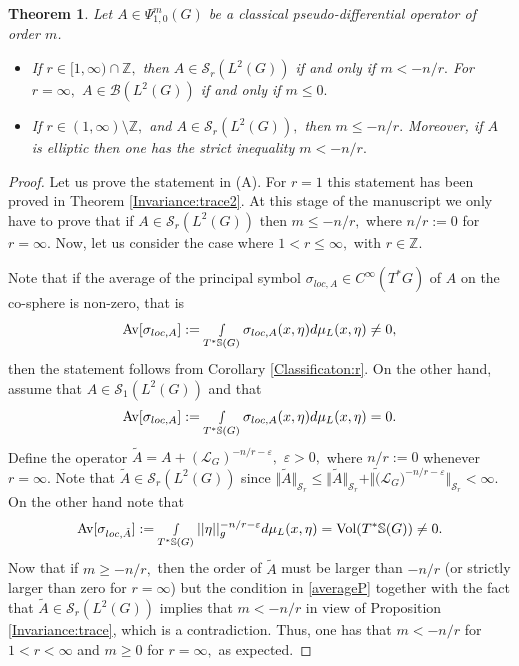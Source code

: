 \documentclass[12pt, reqno]{amsart}
\newtheorem{theorem}{Theorem}[section]
\theoremstyle{definition}
\theoremstyle{remark}
\numberwithin{equation}{section}
\begin{document}
\begin{theorem}\label{Invariance:trace2r} Let $A\in \Psi^{m}_{1,0}(G)$ be a classical  pseudo-differential operator of order $m$.
\begin{itemize}
    \item[(A)] If $r\in [1,\infty)\cap \mathbb{Z},$ then
$A\in \mathscr{S}_r(L^2(G))$ if and only if $m<-n/r.$ For $r=\infty,$     $A\in \mathscr{B}(L^2(G))$ if and only if $m\leq 0.$ 
\item[(B)] If $r\in (1,\infty)\setminus \mathbb{Z},$ and   $A\in \mathscr{S}_{r}(L^2(G)),$ then $m\leq -n/r.$ Moreover, if $A$ is elliptic then one has the strict inequality $m<-n/r.$
\end{itemize}
\end{theorem}
\begin{proof}
Let us prove the statement in (A).
For $r=1$ this statement  has been proved in Theorem \ref{Invariance:trace2}. At this stage of the manuscript we only have to prove that if  $A\in  \mathscr{S}_r(L^2(G)) $ then $m\leq -n/r,$ where $n/r:=0$ for $r=\infty.$  Now, let us consider the case where $1<r\leq \infty,$ with $r\in \mathbb{Z}.$ 

Note that if the average of the principal symbol $\sigma_{loc,A}\in C^\infty(T^*G)$ of $A$ on the co-sphere is non-zero, that is
\begin{equation}
    \textnormal{Av}[\sigma_{loc,A}]:=\smallint\limits_{ T^{*}\mathbb{S}(G)}\sigma_{loc,A}(x,\eta)d\mu_{L}(x,\eta)\neq 0,
\end{equation}then the statement follows from Corollary \ref{Classificaton:r}. On the other hand, assume that $A\in \mathscr{S}_1(L^2(G))$ and that 
\begin{equation}
    \textnormal{Av}[\sigma_{loc,A}]:=\smallint\limits_{ T^{*}\mathbb{S}(G)}\sigma_{loc,A}(x,\eta)d\mu_{L}(x,\eta)= 0.
\end{equation}Define the operator $\tilde{A}=A+(\mathcal{L}_G)^{-n/r-\varepsilon},$ $\varepsilon>0,$ where $n/r:=0$ whenever $r=\infty.$ Note that $\tilde A\in  \mathscr{S}_r(L^2(G)) $ since $\Vert \tilde A\Vert_{\mathscr{S}_r}\leq \Vert \tilde A\Vert_{\mathscr{S}_r}+\Vert \tilde (\mathcal{L}_G)^{-n/r-\varepsilon}\Vert_{\mathscr{S}_r}<\infty. $ On the other hand note that 
\begin{equation}\label{averageP}
    \textnormal{Av}[\sigma_{loc,\tilde A}]:=\smallint\limits_{ T^{*}\mathbb{S}(G)}||\eta||^{-n/r-\varepsilon}_gd\mu_{L}(x,\eta)=\textnormal{Vol}(T^*\mathbb{S}(G))\neq 0.
\end{equation}Now that if $m\geq -n/r,$ then the order of $\tilde A$ must be larger than $-n/r$ (or strictly larger than zero for $r=\infty$) but the condition in  \eqref{averageP} together with the fact that $\tilde A\in \mathscr{S}_r(L^2(G))$  implies that $m<-n/r$ in view of Proposition \ref{Invariance:trace}, which is a contradiction. Thus, one has that $m<-n/r$ for $1<r<\infty$ and $m\geq 0$ for $r=\infty,$ as expected.


\end{proof}
\end{document}
